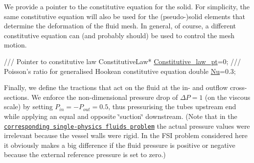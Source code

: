 We provide a pointer to the constitutive equation for the solid. For simplicity, the same constitutive equation will also be used for the (pseudo-\/)solid elements that determine the deformation of the fluid mesh. In general, of course, a different constitutive equation can (and probably should) be used to control the mesh motion.


\begin{DoxyCodeInclude}
\textcolor{comment}{}
\textcolor{comment}{ /// Pointer to constitutive law}
\textcolor{comment}{} ConstitutiveLaw* \hyperlink{namespaceGlobal__Parameters_adbd1f040f375c96fe56b3f475f7dbec2}{Constitutive\_law\_pt}=0;
\textcolor{comment}{}
\textcolor{comment}{ /// Poisson's ratio for generalised Hookean constitutive equation}
\textcolor{comment}{} \textcolor{keywordtype}{double} \hyperlink{namespaceGlobal__Parameters_a20fccdcfa2c15ad8b951b9ada3bb1661}{Nu}=0.3;

\end{DoxyCodeInclude}


Finally, we define the tractions that act on the fluid at the in-\/ and outflow cross-\/sections. We enforce the non-\/dimensional pressure drop of $ \Delta P = 1$ (on the viscous scale) by setting $ P_{in} = -P_{out}=0.5 $, thus pressurising the tube\textquotesingle{}s upstream end while applying an equal and opposite \char`\"{}suction\char`\"{} downstream. (Note that in the \href{../../../navier_stokes/unstructured_three_d_fluid/html/index.html}{\tt corresponding single-\/physics fluids problem} the actual pressure values were irrelevant because the vessel walls were rigid. In the F\+SI problem considered here it obviously makes a big difference if the fluid pressure is positive or negative because the external reference pressure is set to zero.)


